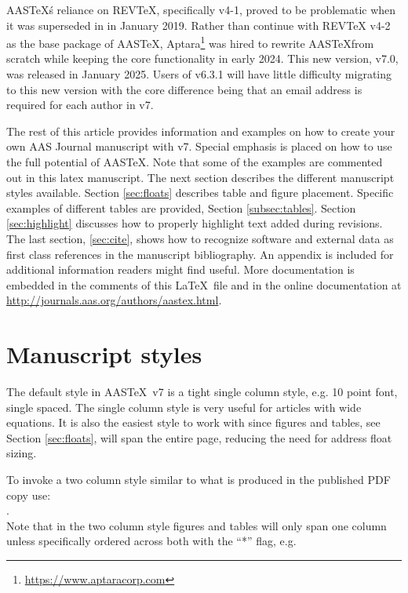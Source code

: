 \documentclass[linenumbers,trackchanges]{aastex7}
\newcommand\aastex{AAS\TeX}
\newcommand\latex{La\TeX}
\begin{document}
\aastex\'s reliance on REVTeX, specifically v4-1, proved to be problematic when it was superseded in in January 2019. Rather than continue with REVTeX v4-2 as the base package of \aastex, Aptara\footnote{\url{https://www.aptaracorp.com}} was hired to rewrite \aastex from scratch while keeping the core functionality in early 2024. This new version, v7.0, was released in January 2025. Users of v6.3.1 will have little difficulty migrating to this new version with the core difference being that an email address is required for each author in v7.

The rest of this article provides information and examples on how to create
your own AAS Journal manuscript with v7.  Special emphasis is placed on
how to use the full potential of \aastex. Note that some of the examples are commented out in this latex manuscript. The next section describes
the different manuscript styles available.
Section \ref{sec:floats} describes table and figure placement. 
Specific examples of different tables are provided,  Section
\ref{subsec:tables}.
Section \ref{sec:highlight}
discusses how to properly highlight text added during revisions.  
The last section,
\ref{sec:cite}, shows how to recognize software and external data as first
class references in the manuscript bibliography.  An appendix is included
for additional information readers might find useful.
More documentation is embedded in the comments of this \latex\ file and in the online documentation at
\url{http://journals.aas.org/authors/aastex.html}.

\section{Manuscript styles} \label{sec:style}

The default style in \aastex\ v7 is a tight single column style, e.g. 10
point font, single spaced.  The single column style is very useful for
articles with wide equations. It is also the easiest style to work with
since figures and tables, see Section \ref{sec:floats}, will span the
entire page, reducing the need for address float sizing.

To invoke a two column style similar to what is produced in
the published PDF copy use: \\

. \\

\noindent Note that in the two column style figures and tables will only
span one column unless specifically ordered across both with the ``*'' flag,
e.g. \\
\end{document}
